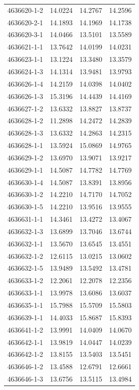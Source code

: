 \begin{longtable}{lrrr}
4636620-1-2 & 14.0224 & 14.2767 & 14.2596 \\
4636620-2-1 & 14.1893 & 14.1969 & 14.1738 \\
4636620-3-1 & 14.0466 & 13.5101 & 13.5589 \\
4636621-1-1 & 13.7642 & 14.0199 & 14.0231 \\
4636623-1-1 & 13.1224 & 13.3480 & 13.3579 \\
4636624-1-3 & 14.1314 & 13.9481 & 13.9793 \\
4636626-1-4 & 14.2159 & 14.0398 & 14.0402 \\
4636626-1-3 & 15.3196 & 14.4439 & 14.4169 \\
4636627-1-2 & 13.6332 & 13.8827 & 13.8737 \\
4636628-1-2 & 11.2898 & 14.2472 & 14.2839 \\
4636628-1-3 & 13.6332 & 14.2863 & 14.2315 \\
4636628-1-1 & 13.5924 & 15.0869 & 14.9765 \\
4636629-1-2 & 13.6970 & 13.9071 & 13.9217 \\
4636629-1-1 & 14.5087 & 14.7782 & 14.7769 \\
4636630-1-4 & 14.5087 & 13.8391 & 13.8956 \\
4636630-1-2 & 14.2210 & 14.7170 & 14.7052 \\
4636630-1-5 & 14.2210 & 13.9516 & 13.9555 \\
4636631-1-1 & 14.3461 & 13.4272 & 13.4067 \\
4636632-1-3 & 13.6899 & 13.7046 & 13.6744 \\
4636632-1-1 & 13.5670 & 13.6545 & 13.4551 \\
4636632-1-2 & 12.6115 & 13.0215 & 13.0602 \\
4636632-1-5 & 13.9489 & 13.5492 & 13.4781 \\
4636633-1-2 & 12.2061 & 12.2078 & 12.2356 \\
4636633-1-1 & 13.9978 & 13.6086 & 13.6037 \\
4636635-1-1 & 15.7988 & 15.5709 & 15.5803 \\
4636639-1-1 & 14.4033 & 15.8687 & 15.8393 \\
4636641-1-2 & 13.9991 & 14.0409 & 14.0670 \\
4636642-1-1 & 13.9819 & 14.0447 & 14.0239 \\
4636642-1-2 & 13.8155 & 13.5403 & 13.5451 \\
4636646-1-2 & 13.4588 & 12.6791 & 12.6661 \\
4636646-1-3 & 13.6756 & 13.5115 & 13.4984 \\

\end{longtable}
